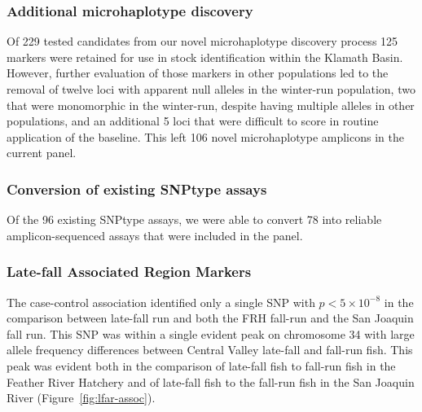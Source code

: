 \subsubsection*{Additional microhaplotype discovery}

Of 229 tested candidates from our novel microhaplotype discovery process
125 markers were retained \citep{thompson2020complex}
for use in stock identification within
the Klamath Basin.  However, further evaluation of those markers in other
populations led to the removal of
twelve loci with apparent null alleles in the winter-run population, two that were monomorphic
in the winter-run, despite having
multiple alleles in other populations, and an additional 5 loci that were
difficult to score in routine application of the baseline. This left 106
novel microhaplotype amplicons in the current panel.


\subsubsection*{Conversion of existing SNPtype assays}

Of the 96 existing SNPtype assays, we were able to convert 78
into reliable amplicon-sequenced assays that were included in the panel.



\subsubsection*{Late-fall Associated Region Markers}

The case-control association identified only a single SNP with $p < 5\times 10^{-8}$ in the comparison
between late-fall run and both the FRH fall-run and the San Joaquin fall run.  This SNP was within
a single evident peak on chromosome 34 with large allele frequency differences
between Central Valley late-fall and fall-run fish.  This peak was evident both in the comparison of
late-fall fish to fall-run fish in the Feather River Hatchery and of late-fall fish to the fall-run fish in
the San Joaquin River (Figure~\ref{fig:lfar-assoc}).




